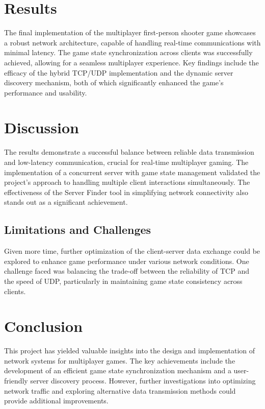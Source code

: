 \section{Results}
\label{chap:results}
The final implementation of the multiplayer first-person shooter game showcases a robust network architecture, capable of handling real-time communications with minimal latency. The game state synchronization across clients was successfully achieved, allowing for a seamless multiplayer experience. Key findings include the efficacy of the hybrid TCP/UDP implementation and the dynamic server discovery mechanism, both of which significantly enhanced the game's performance and usability.

\section{Discussion}
\label{chap:discussion}
The results demonstrate a successful balance between reliable data transmission and low-latency communication, crucial for real-time multiplayer gaming. The implementation of a concurrent server with game state management validated the project's approach to handling multiple client interactions simultaneously. The effectiveness of the Server Finder tool in simplifying network connectivity also stands out as a significant achievement.

\subsection{Limitations and Challenges}
Given more time, further optimization of the client-server data exchange could be explored to enhance game performance under various network conditions. One challenge faced was balancing the trade-off between the reliability of TCP and the speed of UDP, particularly in maintaining game state consistency across clients.


\section{Conclusion}
\label{chap:conclusion}
This project has yielded valuable insights into the design and implementation of network systems for multiplayer games. The key achievements include the development of an efficient game state synchronization mechanism and a user-friendly server discovery process. However, further investigations into optimizing network traffic and exploring alternative data transmission methods could provide additional improvements.

